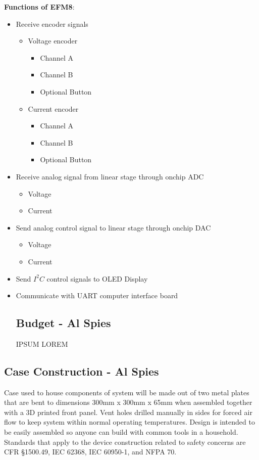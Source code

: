 \documentclass[15pt]{article}
\begin{document}
\noindent \textbf{Functions of EFM8}:
\begin{itemize}
    \item Receive encoder signals \begin{itemize}
        \item Voltage encoder  \begin{itemize}
            \item Channel A
            \item Channel B
            \item Optional Button
        \end{itemize}
        \item Current encoder  \begin{itemize}
            \item Channel A
            \item Channel B
            \item Optional Button
        \end{itemize}
    \end{itemize}
    \item Receive analog signal from linear stage through onchip ADC \begin{itemize}
        \item Voltage
        \item Current
    \end{itemize}
    \item Send analog control signal to linear stage through onchip DAC \begin{itemize}
        \item Voltage
        \item Current
    \end{itemize}
    \item Send $I^2C$ control signals to OLED Display
    \item Communicate with UART computer interface board
\subsection{Budget - Al Spies}
IPSUM LOREM
\end{itemize}
\pagebreak
\subsection{Case Construction - Al Spies}
	Case used to house components of system will be made out of two metal plates that are bent to dimensions 300mm x 300mm x 65mm when assembled together with a 3D printed front panel. Vent holes drilled manually in sides for forced air flow to keep system within normal operating temperatures. Design is intended to be easily assembled so anyone can build with common tools in a household. Standards that apply to the device construction related to safety concerns are CFR §1500.49\cite{11}, IEC 62368\cite{5}, IEC 60950-1\cite{13}, and NFPA 70\cite{12}.
\end{document}
